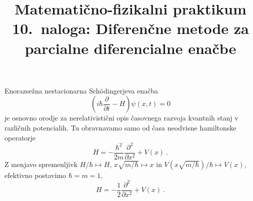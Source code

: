 \documentclass[slovene,11pt,a4paper]{article}
\title{
\sc\large Matematično-fizikalni praktikum \thisyear \\
\bigskip
\bf\Large 10.~naloga: Diferenčne metode za parcialne diferencialne enačbe
}
\author{}
\date{}
\newcommand{\pd}{\partial}
\newcommand{\Pd}[3][{}]{\frac{\pd^{#1} #2}{\pd #3^{#1}}}
\begin{document}
\maketitle
\vspace{-1cm}

Enorazsežna nestacionarna Sch\"odingerjeva enačba
\begin{equation*}
  \left(i\hbar\Pd{}{t}-H\right)\psi(x,t)=0
\end{equation*}
je osnovno orodje za nerelativistični opis časovnega razvoja kvantnih stanj v različnih potencialih. Tu obravnavamo samo od časa neodvisne hamiltonske operatorje
\begin{equation*}
  H=-\frac{\hbar^2}{2m}\Pd[2]{}{x}+V(x)\>.
\end{equation*}
Z menjavo spremenljivk $H/\hbar\mapsto H$, $x\sqrt{m/\hbar}\mapsto x$ in $V(x\sqrt{m/\hbar})/\hbar\mapsto V(x)$, efektivno postavimo $\hbar=m=1$,
\begin{equation}
  H=-\frac12\Pd[2]{}{x}+V(x)\>.
  \label{eq:hamilton}
\end{equation}
\end{document}
